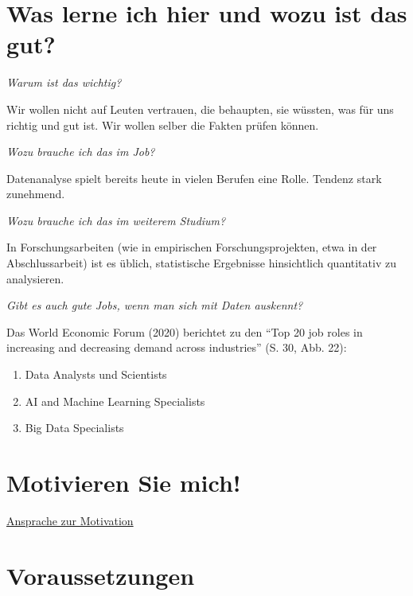 \documentclass[
  a4paper,
  DIV=11]{scrreprt}
\providecommand{\tightlist}{%
  \setlength{\itemsep}{0pt}\setlength{\parskip}{0pt}}\usepackage{longtable,booktabs,array}
\theoremstyle{definition}
\theoremstyle{definition}
\theoremstyle{remark}
\begin{document}
\hypertarget{was-lerne-ich-hier-und-wozu-ist-das-gut}{%
\section*{Was lerne ich hier und wozu ist das
gut?}\label{was-lerne-ich-hier-und-wozu-ist-das-gut}}


\emph{Warum ist das wichtig? }

Wir wollen nicht auf Leuten vertrauen, die behaupten, sie wüssten, was
für uns richtig und gut ist. Wir wollen selber die Fakten prüfen können.

\emph{Wozu brauche ich das im Job?}

Datenanalyse spielt bereits heute in vielen Berufen eine Rolle. Tendenz
stark zunehmend.

\emph{Wozu brauche ich das im weiterem Studium?}

In Forschungsarbeiten (wie in empirischen Forschungsprojekten, etwa in
der Abschlussarbeit) ist es üblich, statistische Ergebnisse hinsichtlich
quantitativ zu analysieren.

\emph{Gibt es auch gute Jobs, wenn man sich mit Daten auskennt?}

Das World Economic Forum (2020) berichtet zu den ``Top 20 job roles in
increasing and decreasing demand across industries'' (S. 30, Abb. 22):

\begin{enumerate}
\def\labelenumi{\arabic{enumi}.}
\tightlist
\item
  Data Analysts und Scientists
\item
  AI and Machine Learning Specialists
\item
  Big Data Specialists
\end{enumerate}

\hypertarget{motivieren-sie-mich}{%
\section*{Motivieren Sie mich!}\label{motivieren-sie-mich}}


\href{https://youtu.be/jtNlzpcPr5Y}{Ansprache zur Motivation}

\hypertarget{voraussetzungen}{%
\section*{Voraussetzungen}\label{voraussetzungen}}
\end{document}
